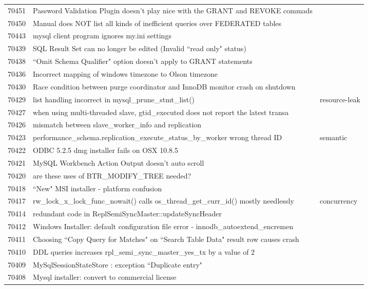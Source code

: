 \begin{longtable}[c]{p{1cm}p{8cm}p{3cm}}
70451 & Password Validation Plugin doesn't play nice with the GRANT and REVOKE commads &  \\
70450 & Manual does NOT list all kinds of inefficient queries over FEDERATED tables &  \\
70443 & mysql client program ignores my.ini settings &  \\
70439 & SQL Result Set can no longer be edited (Invalid ``read only" status) &  \\
70438 & ``Omit Schema Qualifier" option doesn't apply to GRANT statements &  \\
70436 & Incorrect mapping of windows timezone to Olson timezone &  \\
70430 & Race condition between purge coordinator and InnoDB monitor crash on shutdown &  \\
70429 & list handling incorrect in mysql\_prune\_stmt\_list() & resource-leak \\
70427 & when using multi-threaded slave, gtid\_executed does not report the latest transa &  \\
70426 & mismatch between slave\_worker\_info and replication &  \\
70423 & performance\_schema.replication\_execute\_status\_by\_worker wrong thread ID & semantic \\
70422 & ODBC 5.2.5 dmg installer fails on OSX 10.8.5 &  \\
70421 & MySQL Workbench Action Output doesn't auto scroll &  \\
70420 & are these uses of BTR\_MODIFY\_TREE needed? &  \\
70418 & ``New" MSI installer - platform confusion &  \\
70417 & rw\_lock\_x\_lock\_func\_nowait() calls os\_thread\_get\_curr\_id() mostly needlessly & concurrency \\
70414 & redundant code in ReplSemiSyncMaster::updateSyncHeader &  \\
70412 & Windows Installer: default configuration file error - innodb\_autoextend\_encremen &  \\
70411 & Choosing ``Copy Query for Matches" on ``Search Table Data" result row causes crash &  \\
70410 & DDL queries increases rpl\_semi\_sync\_master\_yes\_tx by a value of 2 &  \\
70409 & MySqlSessionStateStore : exception ``Duplicate entry" &  \\
70408 & Mysql installer: convert to commercial license &  \\

\end{longtable}
